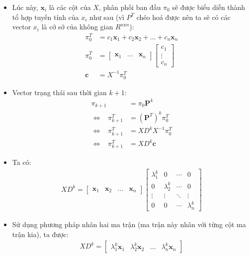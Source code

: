 \begin{proofvn}
\begin{itemize}
        \item Lúc này, $\textbf{x}_i$ là các cột của $X$, phân phối ban đầu $\pi_0$ sẽ được biểu diễn thành tổ hợp tuyến tính của $x_i$ như sau (vì $P^T$ chéo hoá được nên ta sẽ có các vector $x_i$ là cớ sở của không gian $R^{n\text{x}n}$):
        \begin{align}
            \pi_0^T &= c_1 \textbf{x}_1 + c_2 \textbf{x}_2 + ... + c_n \textbf{x}_n \\
            \pi_0^T &= 
            \begin{bmatrix}
                \textbf{x}_1 & ... & \textbf{x}_n 
            \end{bmatrix} 
            \begin{bmatrix}
                c_1 \\
                \vdots \\
                c_n
            \end{bmatrix}\\
            \textbf{c} &= X^{-1} \pi_0^T
        \end{align}

        \item Vector trạng thái sau thời gian $k+1$:
        \begin{align}
            \pi_{k+1} &= \pi_0 \mathbf{P}^k \\
            \Leftrightarrow \hspace{10pt} \pi_{k+1}^T &= (\mathbf{P}^T)^k \pi_0^{T} \\
            \Leftrightarrow \hspace{10pt} \pi_{k+1}^T &= X D^k X^{-1} \pi_0^{T} \\
            \Leftrightarrow \hspace{10pt} \pi_{k+1}^T &= X D^k \textbf{c}
        \end{align}

        \item Ta có:
        \begin{align}
            X D^k =  \begin{bmatrix}
            \textbf{x}_1& \textbf{x}_2 & \dots& \textbf{x}_n
            \end{bmatrix} 
            \begin{bmatrix}
            \lambda_1^k&0& \dotsb &0\\
            0&\lambda_2^k& \dotsb &0\\
            \vdots & \vdots & \ddots & \vdots\\
            0&0&\dotsb & \lambda_n^k
            \end{bmatrix}
        \end{align}
        \item Sử dụng phương pháp nhân hai ma trận (ma trận này nhân với từng cột ma trận kia), ta được:
        \begin{align}
            X D^k =  
            \begin{bmatrix}
            \lambda_1^k\textbf{x}_1& \lambda_2^k\textbf{x}_2 & \dots&\lambda_n^k\textbf{x}_n
            \end{bmatrix} 
        \end{align}


\end{itemize}
\end{proofvn}
